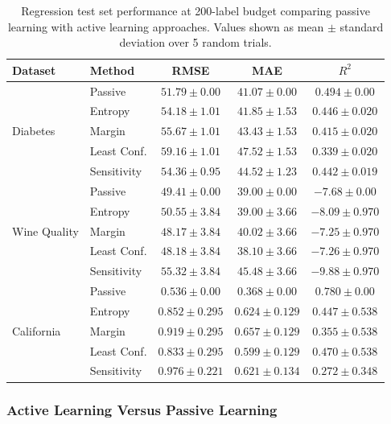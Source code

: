 \documentclass[conference]{IEEEtran}
\begin{document}
\begin{table}[t]
\centering
\caption{Regression test set performance at 200-label budget comparing passive learning with active learning approaches. Values shown as mean $\pm$ standard deviation over 5 random trials.}
\label{tab:reg-results}
\begin{tabular}{llccc}
\toprule
Dataset & Method & RMSE & MAE & $R^2$ \\
\midrule
\multirow{5}{*}{Diabetes} & Passive & $\mathbf{51.79 \pm 0.00}$ & $\mathbf{41.07 \pm 0.00}$ & $\mathbf{0.494 \pm 0.00}$ \\
 & Entropy & $54.18 \pm 1.01$ & $41.85 \pm 1.53$ & $0.446 \pm 0.020$ \\
 & Margin & $55.67 \pm 1.01$ & $43.43 \pm 1.53$ & $0.415 \pm 0.020$ \\
 & Least Conf. & $59.16 \pm 1.01$ & $47.52 \pm 1.53$ & $0.339 \pm 0.020$ \\
 & Sensitivity & $54.36 \pm 0.95$ & $44.52 \pm 1.23$ & $0.442 \pm 0.019$ \\
\midrule
\multirow{5}{*}{Wine Quality} & Passive & $\mathbf{49.41 \pm 0.00}$ & $\mathbf{39.00 \pm 0.00}$ & $\mathbf{-7.68 \pm 0.00}$ \\
 & Entropy & $50.55 \pm 3.84$ & $39.00 \pm 3.66$ & $-8.09 \pm 0.970$ \\
 & Margin & $48.17 \pm 3.84$ & $40.02 \pm 3.66$ & $-7.25 \pm 0.970$ \\
 & Least Conf. & $48.18 \pm 3.84$ & $38.10 \pm 3.66$ & $-7.26 \pm 0.970$ \\
 & Sensitivity & $55.32 \pm 3.84$ & $45.48 \pm 3.66$ & $-9.88 \pm 0.970$ \\
\midrule
\multirow{5}{*}{California} & Passive & $\mathbf{0.536 \pm 0.00}$ & $\mathbf{0.368 \pm 0.00}$ & $\mathbf{0.780 \pm 0.00}$ \\
 & Entropy & $0.852 \pm 0.295$ & $0.624 \pm 0.129$ & $0.447 \pm 0.538$ \\
 & Margin & $0.919 \pm 0.295$ & $0.657 \pm 0.129$ & $0.355 \pm 0.538$ \\
 & Least Conf. & $0.833 \pm 0.295$ & $0.599 \pm 0.129$ & $0.470 \pm 0.538$ \\
 & Sensitivity & $0.976 \pm 0.221$ & $0.621 \pm 0.134$ & $0.272 \pm 0.348$ \\
\bottomrule
\end{tabular}
\end{table}

\subsubsection{Active Learning Versus Passive Learning}
\end{document}
